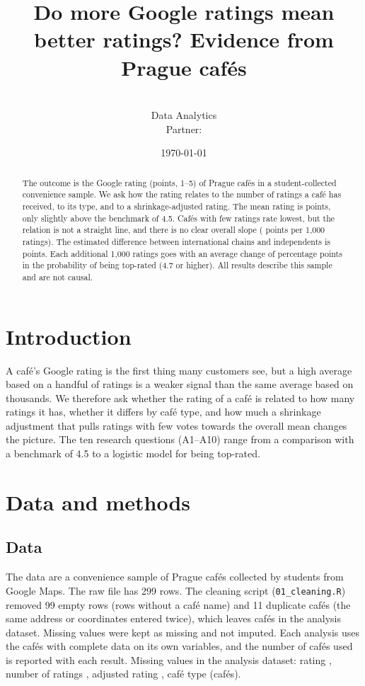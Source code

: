\documentclass[11pt,a4paper]{article}
\title{\textbf{Do more Google ratings mean better ratings? Evidence from Prague caf\'es}}
\author{\MyName\\[0.3ex]\small Data Analytics\\[0.3ex]\small Partner: \PartnerName}
\date{\today}
\newcommand{\RawRows}{299}      %
\newcommand{\EmptyRows}{99}     %
\newcommand{\DupRows}{11}        %
\begin{document}
\maketitle

\begin{abstract}
\noindent The outcome is the Google rating (points, 1--5) of \NCafes{} Prague caf\'es in a student-collected convenience sample. We ask how the rating relates to the number of ratings a caf\'e has received, to its type, and to a shrinkage-adjusted rating. The mean rating is \AoneEst{} points, only slightly above the benchmark of 4.5. Caf\'es with few ratings rate lowest, but the relation is not a straight line, and there is no clear overall slope (\AsevenEst{} points per 1,000 ratings). The estimated difference between international chains and independents is \AeightIntEst{} points. Each additional 1,000 ratings goes with an average change of \AtenEst{} percentage points in the probability of being top-rated (4.7 or higher). All results describe this sample and are not causal.
\end{abstract}

\section{Introduction}
A caf\'e's Google rating is the first thing many customers see, but a high average based on a handful of ratings is a weaker signal than the same average based on thousands. We therefore ask whether the rating of a caf\'e is related to how many ratings it has, whether it differs by caf\'e type, and how much a shrinkage adjustment that pulls ratings with few votes towards the overall mean changes the picture. The ten research questions (A1--A10) range from a comparison with a benchmark of 4.5 to a logistic model for being top-rated.

\section{Data and methods}

\subsection{Data}
The data are a convenience sample of Prague caf\'es collected by students from Google Maps. The raw file has \RawRows{} rows. The cleaning script (\texttt{01\_cleaning.R}) removed \EmptyRows{} empty rows (rows without a caf\'e name) and \DupRows{} duplicate caf\'es (the same address or coordinates entered twice), which leaves \NCafes{} caf\'es in the analysis dataset. Missing values were kept as missing and not imputed. Each analysis uses the caf\'es with complete data on its own variables, and the number of caf\'es used is reported with each result. Missing values in the analysis dataset: rating \MissRating{}, number of ratings \MissNratings{}, adjusted rating \MissAdj{}, caf\'e type \MissType{} (caf\'es).
\end{document}
